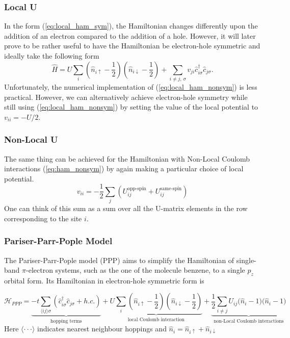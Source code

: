 \subsubsection{Local U}
In the form (\ref{eq:local_ham_sym}), the Hamiltonian changes differently upon the addition of an electron compared to the addition of a hole. However, it will later prove to be rather useful to have the Hamiltonian be electron-hole symmetric and ideally take the following form
\begin{equation}
    \hat{H} = U \sum_i \left(\hat{n}_{i\uparrow}-\frac{1}{2}\right)\left(\hat{n}_{i\downarrow}-\frac{1}{2}\right)+\sum_{i\neq j,\,\sigma} v_{j i} \hat{c}_{i \sigma}^{\dagger} \hat{c}_{j \sigma}\label{eq:local_ham_sym}.
\end{equation}
Unfortunately, the numerical implementation of (\ref{eq:local_ham_nonsym}) is less practical. However, we can alternatively achieve electron-hole symmetry while still using (\ref{eq:local_ham_nonsym}) by setting the value of the local potential to $v_{ii} = -U / 2$.
\medskip

\subsubsection{Non-Local U}
The same thing can be achieved for the Hamiltonian with Non-Local Coulomb interactions (\ref{eq:ham_nonsym}) by again making a particular choice of local potential. 
\begin{equation}
    v_{ii} = - \frac{1}{2}\sum_{j}\left( U_{ij}^{\text{opp-spin}} + U_{ij}^{\text{same-spin}}\right)
\end{equation}
One can think of this sum as a sum over all the U-matrix elements in the row corresponding to the site $i$. 


\subsubsection{Pariser-Parr-Pople Model}\label{subsec:ppp}

The Pariser-Parr-Pople model (PPP) aims to simplify the Hamiltonian of single-band $\pi$-electron systems, such as the one of the molecule benzene, to a single $p_z$ orbital form. Its Hamiltonian in electron-hole symmetric form is

\begin{equation}
    \mathcal{H}_{PPP} = \underbrace{-t \sum_{\langle ij \rangle \sigma} \left(\hat{c}^\dagger_{i\sigma}\hat{c}_{j\sigma} + h.c.\right) 
    }_{\text{hopping terms}}
    + \underbrace{U \sum_i \left(\hat{n}_{i\uparrow} - \frac{1}{2}\right)\left(\hat{n}_{i\downarrow} - \frac{1}{2}\right)
    }_{\text{local Coulomb interaction}}
    + \underbrace{\frac{1}{2}\sum_{i\neq j} U_{ij} \bigg(\hat{n}_{i} - 1\bigg)\bigg(\hat{n}_{i} - 1\bigg)
    }_{\text{non-Local Coulomb interactions}}
\end{equation}
Here $\langle \cdot\cdot\cdot \rangle$ indicates nearest neighbour hoppings and $\hat{n}_i = \hat{n}_{i\uparrow} + \hat{n}_{i\downarrow}$
\\


